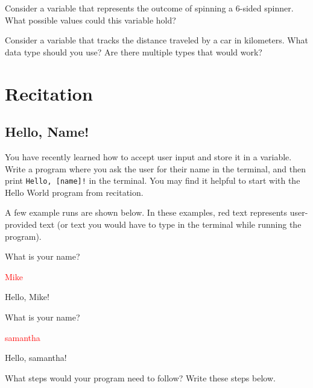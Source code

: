 \begin{problem}
    Consider a variable that represents the outcome of spinning a 6-sided spinner. What possible values could this variable hold? 
\end{problem}

\vspace{1.5cm}

\begin{problem}
    Consider a variable that tracks the distance traveled by a car in kilometers. What data type should you use? Are there multiple types that would work?
\end{problem}

\vspace{1.5cm}

\section{Recitation}

\subsection{Hello, Name!}
You have recently learned how to accept user input and store it in a variable. Write a program where you ask the user for their name in the terminal, and then print \texttt{Hello, [name]!} in the terminal. You may find it helpful to start with the Hello World program from recitation. 

A few example runs are shown below. In these examples, red text represents user-provided text (or text you would have to type in the terminal while running the program). 

\begin{sample}
What is your name?

\textcolor{red}{Mike}

Hello, Mike!
\end{sample}

\begin{sample}
What is your name?

\textcolor{red}{samantha}

Hello, samantha!
\end{sample}

\begin{multipart}
    What steps would your program need to follow? Write these steps below.
\end{multipart}

\vspace{6cm}

